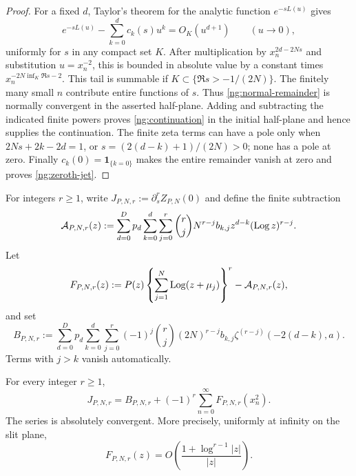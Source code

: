 \begin{proof}
For a fixed $d$, Taylor's theorem for the analytic function
$e^{-sL(u)}$ gives
\[
 e^{-sL(u)}-\sum_{k=0}^{d}c_k(s)u^k=O_K(u^{d+1})
 \qquad(u\to0),
\]
uniformly for $s$ in any compact set $K$.
After multiplication by $x_n^{2d-2Ns}$ and substitution
$u=x_n^{-2}$, this is bounded in absolute value by a constant
times $x_n^{-2N\inf_K\Re s-2}$.
This tail is summable if $K\subset\{\Re s>-1/(2N)\}$.
The finitely many small $n$ contribute entire functions of $s$.
Thus \eqref{ng:normal-remainder} is normally convergent in the
asserted half-plane.  Adding and subtracting the indicated
finite powers proves \eqref{ng:continuation} in the initial
half-plane and hence supplies the continuation.
The finite zeta terms can have a pole only when
$2Ns+2k-2d=1$, or
$s=(2(d-k)+1)/(2N)>0$; none has a pole at zero.
Finally $c_k(0)=\boldsymbol1_{\{k=0\}}$ makes the entire
remainder vanish at zero and proves \eqref{ng:zeroth-jet}.
\end{proof}

For integers $r\geq1$, write
$J_{P,N,r}:=\partial_s^rZ_{P,N}(0)$ and define the finite
subtraction
\begin{equation}
 \mathcal A_{P,N,r}(z)
 :=\sum_{d=0}^{D}p_d\sum_{k=0}^{d}\sum_{j=0}^{r}
       \binom{r}{j}N^{r-j}b_{k,j}
                     z^{d-k}(\operatorname{Log} z)^{r-j}.
 \label{ng:asymptotic-subtraction}
\end{equation}
Let
\begin{equation}
 F_{P,N,r}(z)
 :=P(z)\left\{\sum_{j=1}^{N}\operatorname{Log}(z+\mu_j)\right\}^{r}
                  -\mathcal A_{P,N,r}(z),
 \label{ng:subtracted-function}
\end{equation}
and set
\begin{equation}
 B_{P,N,r}
 :=\sum_{d=0}^{D}p_d\sum_{k=0}^{d}\sum_{j=0}^{r}
       (-1)^j\binom{r}{j}(2N)^{r-j}b_{k,j}
                    \zeta^{(r-j)}(-2(d-k),a).
 \label{ng:finite-baseline}
\end{equation}
Terms with $j>k$ vanish automatically.

\begin{proposition}
\label{ng:ordinary-series}
For every integer $r\geq1$,
\begin{equation}
 J_{P,N,r}
 =B_{P,N,r}+(-1)^r\sum_{n=0}^{\infty}F_{P,N,r}(x_n^2).
 \label{ng:jet-series}
\end{equation}
The series is absolutely convergent.  More precisely, uniformly
at infinity on the slit plane,
\begin{equation}
 F_{P,N,r}(z)
 =O\left(\frac{1+\log^{r-1}|z|}{|z|}\right).
 \label{ng:large-z-bound}
\end{equation}
\end{proposition}

